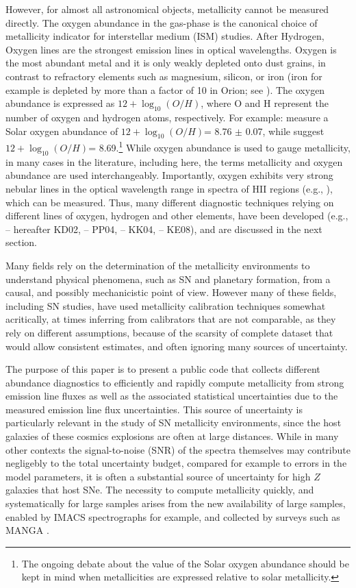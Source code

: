 \documentclass{emulateapj}
\newcommand{\oxabinline}{\ensuremath{12 + \log_{10}(O/H)}}
\begin{document}
However, for almost all astronomical objects, metallicity cannot be
measured directly. The oxygen abundance in the gas-phase is the
canonical choice of metallicity indicator for interstellar medium
(ISM) studies. After Hydrogen, Oxygen lines are the strongest emission
lines in optical wavelengths. Oxygen is the most abundant metal and it
is only weakly depleted onto dust grains, in contrast to refractory
elements such as magnesium, silicon, or iron (iron for example is
depleted by more than a factor of 10 in Orion; see
\citealt{simondiaz11-orion}). The oxygen abundance is expressed as
\oxabinline, where O and H represent the number of oxygen and hydrogen
atoms, respectively. For example: \citealt{chaffau11} measure a Solar
oxygen abundance of \oxabinline = 8.76 $\pm$ 0.07, while
\citet{asplund09_rev} suggest \oxabinline = 8.69.\footnote{The ongoing
  debate about the value of the Solar oxygen abundance should be kept
  in mind when metallicities are expressed relative to solar
  metallicity.}  While oxygen abundance is used to gauge metallicity,
in many cases in the literature, including here, the terms metallicity
and oxygen abundance are used interchangeably.  Importantly, oxygen
exhibits very strong nebular lines in the optical wavelength range in
spectra of HII regions (e.g.,
\citealt{pagel79,osterbrock89,tremonti04}), which can be
measured. Thus, many different diagnostic techniques relying on
different lines of oxygen, hydrogen and other elements, have been
developed (e.g., \citealt{kewley02} -- hereafter KD02,
\citealt{pettini04} -- PP04, \citealt{kobulnicky04} -- KK04,
\citealt{kewley08} -- KE08), and are discussed in the next section.

Many fields rely on the determination of the metallicity environments
to understand physical phenomena, such as SN and planetary formation,
from a causal, and possibly mechanicistic point of view. However many
of these fields, including SN studies, have used metallicity
calibration techniques somewhat acritically, at times inferring from
calibrators that are not comparable, as they rely on different
assumptions, because of the scarsity of complete dataset that would
allow consistent estimates, and often ignoring many sources of
uncertainty.

The purpose of this paper is to present a public code that collects
different abundance diagnostics to efficiently and rapidly compute
metallicity from strong emission line fluxes as well as the associated
statistical uncertainties due to the measured emission line flux
uncertainties. This source of uncertainty is particularly relevant in
the study of SN metallicity environments, since the host galaxies of
these cosmics explosions are often at large distances. While in many
other contexts the signal-to-noise (SNR) of the spectra themselves may
contribute negligebly to the total uncertainty budget, compared for
example to errors in the model parameters, it is often a substantial
source of uncertainty for high $Z$ galaxies that host SNe.  The
necessity to compute metallicity quickly, and systematically for large
samples arises from the new availability of large samples, enabled by
IMACS spectrographs for example, and collected by surveys such as
MANGA \citep{Bundy15}.
\end{document}
